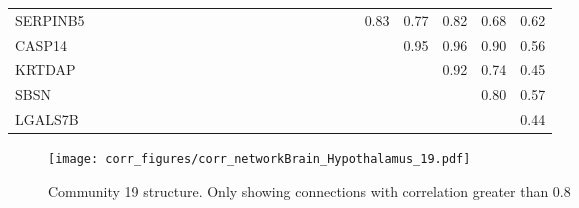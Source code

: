 \begin{longtable}{lrrrrrrrrrrrrrrrrrrrrrrrr}
SERPINB5  &               &            &           &              &            &              &            &              &              &            &            &            &           &                 &            &             &             &            &                &         0.83 &         0.77 &       0.82 &          0.68 &        0.62 \\
CASP14    &               &            &           &              &            &              &            &              &              &            &            &            &           &                 &            &             &             &            &                &              &         0.95 &       0.96 &          0.90 &        0.56 \\
KRTDAP    &               &            &           &              &            &              &            &              &              &            &            &            &           &                 &            &             &             &            &                &              &              &       0.92 &          0.74 &        0.45 \\
SBSN      &               &            &           &              &            &              &            &              &              &            &            &            &           &                 &            &             &             &            &                &              &              &            &          0.80 &        0.57 \\
LGALS7B   &               &            &           &              &            &              &            &              &              &            &            &            &           &                 &            &             &             &            &                &              &              &            &               &        0.44 \\
\end{longtable}


\begin{figure}[h!]
\centering
\texttt{[image: corr\_figures/corr\_networkBrain\_Hypothalamus\_19.pdf]}
\caption{Community 19 structure. Only showing connections with correlation greater than 0.8}
\end{figure}




